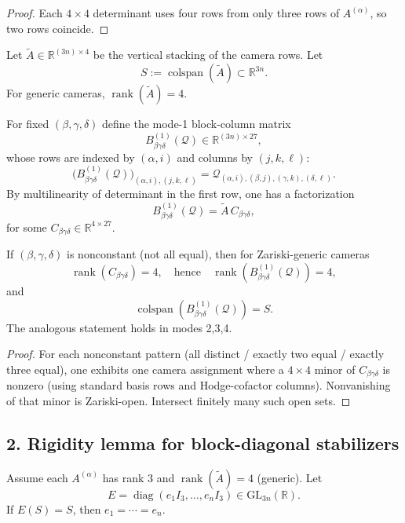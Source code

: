 \begin{proof}
Each $4\times4$ determinant uses four rows from only three rows of $A^{(\alpha)}$, so two rows coincide.
\end{proof}

Let $\widetilde A\in\mathbb R^{(3n)\times 4}$ be the vertical stacking of the camera rows. Let
\[
S:=\operatorname{colspan}(\widetilde A)\subset\mathbb R^{3n}.
\]
For generic cameras, $\operatorname{rank}(\widetilde A)=4$.

For fixed $(\beta,\gamma,\delta)$ define the mode-1 block-column matrix
\[
B^{(1)}_{\beta\gamma\delta}(\mathcal Q)\in\mathbb R^{(3n)\times 27},
\]
whose rows are indexed by $(\alpha,i)$ and columns by $(j,k,\ell)$:
\[
\big(B^{(1)}_{\beta\gamma\delta}(\mathcal Q)\big)_{(\alpha,i),(j,k,\ell)}
=\mathcal Q_{(\alpha,i),(\beta,j),(\gamma,k),(\delta,\ell)}.
\]
By multilinearity of determinant in the first row, one has a factorization
\[
B^{(1)}_{\beta\gamma\delta}(\mathcal Q)=\widetilde A\,C_{\beta\gamma\delta},
\]
for some $C_{\beta\gamma\delta}\in\mathbb R^{4\times 27}$.

\begin{lemma}\label{lem:q9-rank4}
If $(\beta,\gamma,\delta)$ is nonconstant (not all equal), then for Zariski-generic cameras
\[
\operatorname{rank}(C_{\beta\gamma\delta})=4,
\quad\text{hence}\quad
\operatorname{rank}(B^{(1)}_{\beta\gamma\delta}(\mathcal Q))=4,
\]
and
\[
\operatorname{colspan}(B^{(1)}_{\beta\gamma\delta}(\mathcal Q))=S.
\]
The analogous statement holds in modes 2,3,4.
\end{lemma}

\begin{proof}
For each nonconstant pattern (all distinct / exactly two equal / exactly three equal), one exhibits one camera assignment where a $4\times4$ minor of $C_{\beta\gamma\delta}$ is nonzero (using standard basis rows and Hodge-cofactor columns). Nonvanishing of that minor is Zariski-open. Intersect finitely many such open sets.
\end{proof}

\subsection*{2. Rigidity lemma for block-diagonal stabilizers}

\begin{lemma}\label{lem:q9-rigidity}
Assume each $A^{(\alpha)}$ has rank $3$ and $\operatorname{rank}(\widetilde A)=4$ (generic).
Let
\[
E=\operatorname{diag}(e_1 I_3,\dots,e_n I_3)\in\mathrm{GL}_{3n}(\mathbb R).
\]
If $E(S)=S$, then $e_1=\cdots=e_n$.
\end{lemma}

